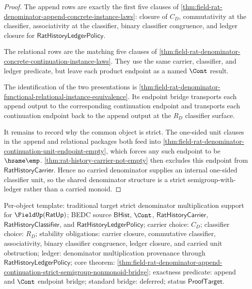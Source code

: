 \begin{proof}
The append rows are exactly the first five clauses of
\autoref{thm:field-rat-denominator-append-concrete-instance-laws}: closure of
$C_D$, commutativity at the classifier, associativity at the classifier, binary
classifier congruence, and ledger closure for
$\mathsf{RatHistoryLedgerPolicy}$.

The relational rows are the matching five clauses of
\autoref{thm:field-rat-denominator-concrete-continuation-instance-laws}. They
use the same carrier, classifier, and ledger predicate, but leave each product
endpoint as a named $\Cont$ result.

The identification of the two presentations is
\autoref{thm:field-rat-denominator-functional-relational-instance-equivalence}.
Its endpoint bridge transports each append output to the corresponding
continuation endpoint and transports each continuation endpoint back to the
append output at the $R_D$ classifier surface.

It remains to record why the common object is strict. The one-sided unit
clauses in the append and relational packages both feed into
\autoref{thm:field-rat-denominator-continuation-unit-endpoint-empty}, which
forces any such endpoint to be $\hsame\emp$.
\autoref{thm:rat-history-carrier-not-empty} then excludes this endpoint from
$\mathsf{RatHistoryCarrier}$. Hence no carried denominator supplies an internal
one-sided classifier unit, so the shared denominator structure is a strict
semigroup-with-ledger rather than a carried monoid.
\end{proof}

Per-object template: traditional target strict denominator multiplication
support for $\FieldUp(\mathsf{RatUp})$; BEDC source $\mathsf{BHist}$, $\Cont$,
$\mathsf{RatHistoryCarrier}$, $\mathsf{RatHistoryClassifier}$, and
$\mathsf{RatHistoryLedgerPolicy}$; carrier choice: $C_D$; classifier choice:
$R_D$; stability obligations: carrier closure, commutative classifier,
associativity, binary classifier congruence, ledger closure, and carried unit
obstruction; ledger: denominator multiplication provenance through
$\mathsf{RatHistoryLedgerPolicy}$; core theorem:
\autoref{thm:field-rat-denominator-append-continuation-strict-semigroup-nonmonoid-bridge};
exactness predicate: append and $\Cont$ endpoint bridge; standard bridge:
deferred; status $\mathsf{ProofTarget}$.

